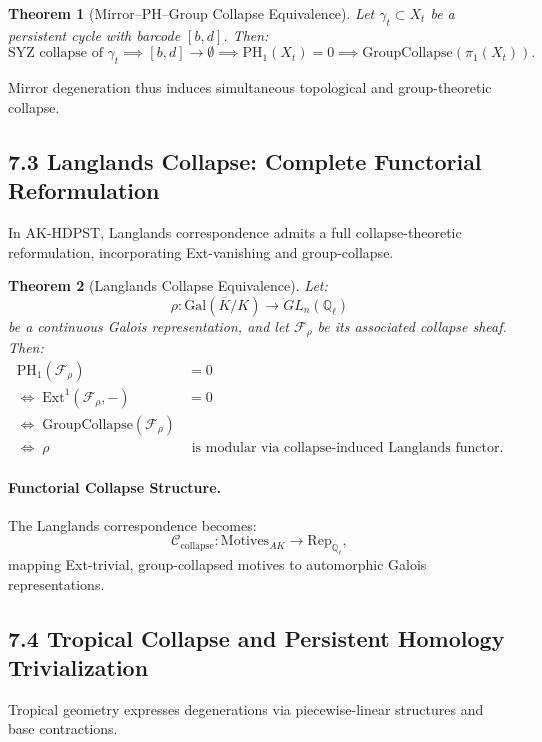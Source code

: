 \documentclass[11pt]{article}
\newtheorem{theorem}{Theorem}[section]
\begin{document}
\begin{theorem}[Mirror–PH–Group Collapse Equivalence]
Let \( \gamma_t \subset X_t \) be a persistent cycle with barcode \( [b,d] \). Then:
\[
\text{SYZ collapse of } \gamma_t \implies [b,d] \to \emptyset \implies \mathrm{PH}_1(X_t) = 0 \implies \text{GroupCollapse}(\pi_1(X_t)).
\]
\end{theorem}

Mirror degeneration thus induces simultaneous topological and group-theoretic collapse.

\subsection*{7.3 Langlands Collapse: Complete Functorial Reformulation}

In AK-HDPST, Langlands correspondence admits a full collapse-theoretic reformulation, incorporating Ext-vanishing and group-collapse.

\begin{theorem}[Langlands Collapse Equivalence]
Let:
\[
\rho: \mathrm{Gal}(\overline{K}/K) \longrightarrow GL_n(\mathbb{Q}_\ell)
\]
be a continuous Galois representation, and let \( \mathcal{F}_\rho \) be its associated collapse sheaf. Then:
\begin{align*}
\mathrm{PH}_1(\mathcal{F}_\rho) &= 0 \\
\iff\; \mathrm{Ext}^1(\mathcal{F}_\rho, -) &= 0 \\
\iff\; \mathrm{GroupCollapse}(\mathcal{F}_\rho) \\
\iff\; \rho &\text{ is modular via collapse-induced Langlands functor}.
\end{align*}
\end{theorem}

\paragraph{Functorial Collapse Structure.}
The Langlands correspondence becomes:
\[
\mathcal{C}_{\mathrm{collapse}}: \mathrm{Motives}_{AK} \longrightarrow \mathrm{Rep}_{\mathbb{Q}_\ell},
\]
mapping Ext-trivial, group-collapsed motives to automorphic Galois representations.

\subsection*{7.4 Tropical Collapse and Persistent Homology Trivialization}

Tropical geometry expresses degenerations via piecewise-linear structures and base contractions.
\end{document}
